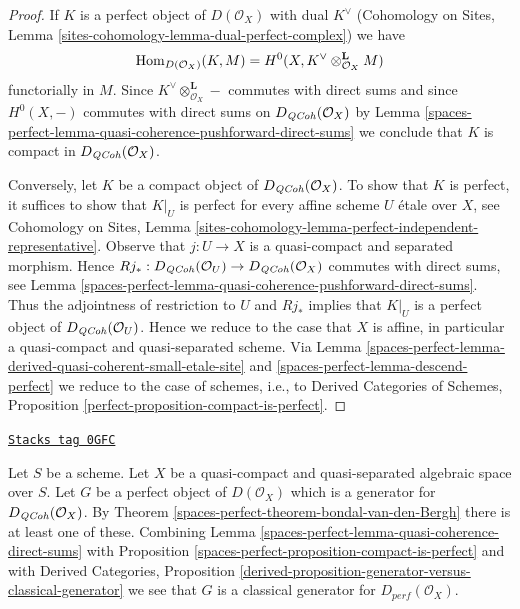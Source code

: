 \begin{proof}
If $K$ is a perfect object of $D(\mathcal{O}_X)$ with dual
$K^\vee$ (Cohomology on Sites, Lemma
\ref{sites-cohomology-lemma-dual-perfect-complex})
we have
$$
\operatorname{Hom}_{D(\mathcal{O}_X)}(K, M) =
H^0(X, K^\vee \otimes_{\mathcal{O}_X}^\mathbf{L} M)
$$
functorially in $M$. Since $K^\vee \otimes_{\mathcal{O}_X}^\mathbf{L} -$
commutes with direct sums and since $H^0(X, -)$ commutes with direct
sums on $D_{\mathit{QCoh}}(\mathcal{O}_X)$ by
Lemma \ref{spaces-perfect-lemma-quasi-coherence-pushforward-direct-sums}
we conclude that $K$ is compact in $D_{\mathit{QCoh}}(\mathcal{O}_X)$.

\medskip\noindent
Conversely, let $K$ be a compact object of $D_{\mathit{QCoh}}(\mathcal{O}_X)$.
To show that $K$ is perfect, it suffices to show that
$K|_U$ is perfect for every affine scheme $U$ \'etale over $X$, see
Cohomology on Sites, Lemma
\ref{sites-cohomology-lemma-perfect-independent-representative}.
Observe that $j : U \to X$ is a quasi-compact and separated morphism.
Hence
$Rj_* : D_{\mathit{QCoh}}(\mathcal{O}_U) \to D_{\mathit{QCoh}}(\mathcal{O}_X)$
commutes with direct sums, see
Lemma \ref{spaces-perfect-lemma-quasi-coherence-pushforward-direct-sums}.
Thus the adjointness of restriction to $U$ and $Rj_*$ implies that
$K|_U$ is a perfect object of $D_{\mathit{QCoh}}(\mathcal{O}_U)$.
Hence we reduce to the case that $X$ is affine, in particular a
quasi-compact and quasi-separated scheme. Via
Lemma \ref{spaces-perfect-lemma-derived-quasi-coherent-small-etale-site} and
\ref{spaces-perfect-lemma-descend-perfect}
we reduce to the case of schemes, i.e., to
Derived Categories of Schemes, Proposition
\ref{perfect-proposition-compact-is-perfect}.
\end{proof}

\begin{remark}
\label{spaces-perfect-remark-classical-generator}
\href{https://stacks.math.columbia.edu/tag/0GFC}{\texttt{Stacks tag 0GFC}}

Let $S$ be a scheme.
Let $X$ be a quasi-compact and quasi-separated algebraic space over $S$.
Let $G$ be a
perfect object of $D(\mathcal{O}_X)$ which is a generator for
$D_{\mathit{QCoh}}(\mathcal{O}_X)$. By Theorem \ref{spaces-perfect-theorem-bondal-van-den-Bergh}
there is at least one of these. Combining
Lemma \ref{spaces-perfect-lemma-quasi-coherence-direct-sums} with
Proposition \ref{spaces-perfect-proposition-compact-is-perfect} and with
Derived Categories, Proposition
\ref{derived-proposition-generator-versus-classical-generator}
we see that $G$ is a classical generator for $D_{perf}(\mathcal{O}_X)$.
\end{remark}

